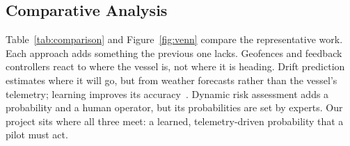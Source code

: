 \documentclass[sigconf]{acmart}
\begin{document}
\subsection{Comparative Analysis}
\label{sec:comparison}

Table~\ref{tab:comparison} and Figure~\ref{fig:venn} compare the representative work. Each approach adds something the previous one lacks. Geofences and feedback controllers react to where the vessel is, not where it is heading. Drift prediction estimates where it will go, but from weather forecasts rather than the vessel's telemetry; learning improves its accuracy~\cite{song2024drift}. Dynamic risk assessment adds a probability and a human operator, but its probabilities are set by experts. Our project sits where all three meet: a learned, telemetry-driven probability that a pilot must act.
\end{document}
